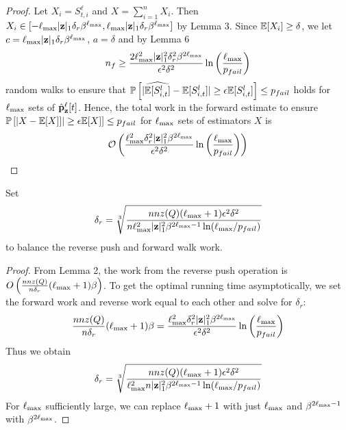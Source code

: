 \begin{proof}
Let $X_i = S_{t, i}^{\ell}$ and $X = \sum_{i=1}^n X_i$. Then $X_i \in [-\ell_{\max}|\mathbf{z}|_1\delta_r \beta^{\ell_{\max}}, \ell_{\max}|\mathbf{z}|_1\delta_r \beta^{\ell_{\max}}]$ by Lemma 3. Since ${\mathbb{E}}[X_i] \geq \delta$, we let $c = \ell_{\max} |\mathbf{z}|_1\delta_r \beta^{\ell_{\max}}$, $a = \delta$ and by Lemma 6
$$n_f \geq \frac{2 \ell_{\max}^2|\mathbf{z}|_1^2 \delta_r^2 \beta^{2\ell_{\max}}}{\epsilon^2\delta^2}\ln \left(\frac{\ell_{\max}}{p_{fail}}\right)$$
random walks to ensure that $\mathbb{P}\left[ | \widehat{{\mathbb{E}}[S_{i, t}^l]}  -  {\mathbb{E}}[S_{i, t}^l]|  \geq  \epsilon  {\mathbb{E}}[S_{i, t}^l] \right] \leq p_{fail}$ holds for $\ell_{\max}$ sets of $\hat{\mathbf{p}}_\mathbf{z}^{\ell}[t]$.
Hence, the total work in the forward estimate to ensure 
$\mathbb{P}\left[ |X -  {\mathbb{E}}[X]]|  \geq  \epsilon  {\mathbb{E}}[X] \right] \leq p_{fail}$ for $\ell_{\max}$ sets of estimators $X$ is
$$\mathcal{O}\left(\frac{\ell_{\max}^2 \delta_r^2|\mathbf{z}|_1^2 \beta^{2\ell_{\max}}}{\epsilon^2\delta^2}\ln \left(\frac{\ell_{\max}}{p_{fail}}\right)\right)$$
\end{proof}

\begin{lemma}
Set 
$$\delta_r = \sqrt[3]{\frac{nnz(Q)(\ell_{\max} + 1) \epsilon^2\delta^2}{n\ell_{\max}^2 |\mathbf{z}|_1^2\beta^{2\ell_{\max} - 1}\ln(\ell_{\max}/p_{fail}) } }$$
to balance the reverse push and forward walk work.
\end{lemma}
\begin{proof}
From Lemma 2, the work from the reverse push operation is
$O\left(\frac{nnz(Q)}{n\delta_r}(\ell_{\max}+1)\beta\right)$.
To get the optimal running time asymptotically, we set the forward work and reverse work equal to each other and solve for $\delta_r$:
\[\frac{nnz(Q)}{n\delta_r}(\ell_{\max}+1)\beta = \frac{\ell_{\max}^2 \delta_r^2|\mathbf{z}|_1^2 \beta^{2\ell_{\max}}}{\epsilon^2\delta^2}\ln \left(\frac{\ell_{\max}}{p_{fail}}\right) \]
Thus we obtain
\begin{equation*}
\delta_r = \sqrt[3]{\frac{nnz(Q)(\ell_{\max} + 1) \epsilon^2\delta^2}{\ell_{\max}^2 n|\mathbf{z}|_1^2\beta^{2\ell_{\max} -1}\ln(\ell_{\max}/p_{fail}) } }
\end{equation*}
For $\ell_{\max}$ sufficiently large, we can replace $\ell_{\max} + 1$ with just $\ell_{\max}$ and $\beta^{2\ell_{\max} -1}$ with $\beta^{2\ell_{\max}}$.
\end{proof}



